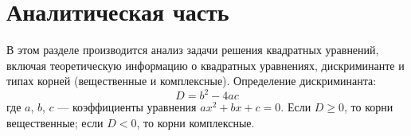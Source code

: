 \chapter{Аналитическая часть}

В этом разделе производится анализ задачи решения квадратных уравнений, 
включая теоретическую информацию о квадратных уравнениях, дискриминанте и 
типах корней (вещественные и комплексные). Определение дискриминанта:
\begin{equation}
	D = b^2 - 4ac
\end{equation}
где \(a\), \(b\), \(c\) — коэффициенты уравнения \(ax^2 + bx + c = 0\). 
Если \(D \geq 0\), то корни вещественные; если \(D < 0\), то корни комплексные.

